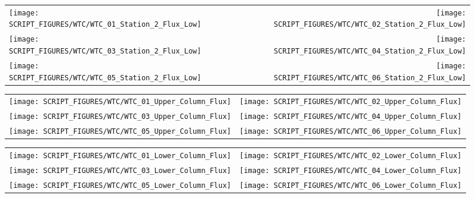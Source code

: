 \newpage

\begin{figure}[!ht]
\begin{tabular*}{\textwidth}{l@{\extracolsep{\fill}}r}
\texttt{[image: SCRIPT\_FIGURES/WTC/WTC\_01\_Station\_2\_Flux\_Low]} &
\texttt{[image: SCRIPT\_FIGURES/WTC/WTC\_02\_Station\_2\_Flux\_Low]} \\
\texttt{[image: SCRIPT\_FIGURES/WTC/WTC\_03\_Station\_2\_Flux\_Low]} &
\texttt{[image: SCRIPT\_FIGURES/WTC/WTC\_04\_Station\_2\_Flux\_Low]} \\
\texttt{[image: SCRIPT\_FIGURES/WTC/WTC\_05\_Station\_2\_Flux\_Low]} &
\texttt{[image: SCRIPT\_FIGURES/WTC/WTC\_06\_Station\_2\_Flux\_Low]}
\end{tabular*}
\label{NIST_WTC_Station_2_Flux_Low}
\end{figure}

\begin{figure}[!ht]
\begin{tabular*}{\textwidth}{l@{\extracolsep{\fill}}r}
\texttt{[image: SCRIPT\_FIGURES/WTC/WTC\_01\_Upper\_Column\_Flux]} &
\texttt{[image: SCRIPT\_FIGURES/WTC/WTC\_02\_Upper\_Column\_Flux]} \\
\texttt{[image: SCRIPT\_FIGURES/WTC/WTC\_03\_Upper\_Column\_Flux]} &
\texttt{[image: SCRIPT\_FIGURES/WTC/WTC\_04\_Upper\_Column\_Flux]} \\
\texttt{[image: SCRIPT\_FIGURES/WTC/WTC\_05\_Upper\_Column\_Flux]} &
\texttt{[image: SCRIPT\_FIGURES/WTC/WTC\_06\_Upper\_Column\_Flux]}
\end{tabular*}
\label{NIST_WTC_Upper_Column_Flux}
\end{figure}

\begin{figure}[!ht]
\begin{tabular*}{\textwidth}{l@{\extracolsep{\fill}}r}
\texttt{[image: SCRIPT\_FIGURES/WTC/WTC\_01\_Lower\_Column\_Flux]} &
\texttt{[image: SCRIPT\_FIGURES/WTC/WTC\_02\_Lower\_Column\_Flux]} \\
\texttt{[image: SCRIPT\_FIGURES/WTC/WTC\_03\_Lower\_Column\_Flux]} &
\texttt{[image: SCRIPT\_FIGURES/WTC/WTC\_04\_Lower\_Column\_Flux]} \\
\texttt{[image: SCRIPT\_FIGURES/WTC/WTC\_05\_Lower\_Column\_Flux]} &
\texttt{[image: SCRIPT\_FIGURES/WTC/WTC\_06\_Lower\_Column\_Flux]}
\end{tabular*}
\label{NIST_WTC_Lower_Column_Flux}
\end{figure}

